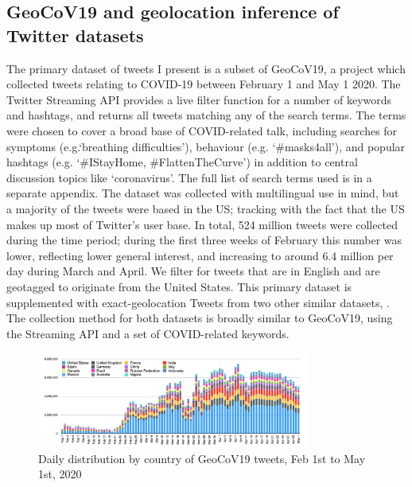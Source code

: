 \documentclass{article}
\begin{document}
\subsection{GeoCoV19 and geolocation inference of Twitter datasets}
The primary dataset of tweets I present is a subset of GeoCoV19, a project which collected tweets relating to COVID-19 between February 1 and May 1 2020. The Twitter Streaming API provides a live filter function for a number of keywords and hashtags, and returns all tweets matching any of the search terms. The terms were chosen to cover a broad base of COVID-related talk, including searches for symptoms (e.g.`breathing difficulties'), behaviour (e.g. `\#masks4all'), and popular hashtags (e.g. `\#IStayHome, \#FlattenTheCurve') in addition to central discussion topics like `coronavirus'. The full list of search terms used is in a separate appendix. The dataset was collected with multilingual use in mind, but a majority of the tweets were based in the US; tracking with the fact that the US makes up most of Twitter's user base. In total, 524 million tweets were collected during the time period; during the first three weeks of February this number was lower, reflecting lower general interest, and increasing to around 6.4 million per day during March and April. We filter for tweets that are in English and are geotagged to originate from the United States. This primary dataset is supplemented with exact-geolocation Tweets from two other similar datasets, \textcite{bandaLargescaleCOVID19Twitter2021,lamsalDesignAnalysisLargescale2020}. The collection method for both datasets is broadly similar to GeoCoV19, using the Streaming API and a set of COVID-related keywords. 
\begin{figure}[h!]
    \includegraphics[width=0.8\textwidth]{figs/GeoCov-countrydistribution.png}    
    \centering
    \caption{Daily distribution by country of GeoCoV19 tweets, Feb 1st to May 1st, 2020 \parencite{qaziGeoCoV19DatasetHundreds2020a}}
\end{figure}
\end{document}
